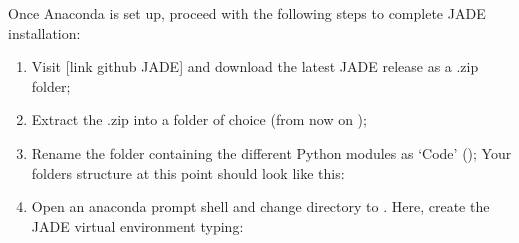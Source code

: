 \documentclass[letterpaper,10pt,english]{sphinxmanual}
\begin{document}
\sphinxAtStartPar
Once Anaconda is set up, proceed with the following steps to complete JADE installation:
\begin{enumerate}
%
\item {} 
\sphinxAtStartPar
Visit {[}link github JADE{]} and download the latest JADE release as a .zip folder;

\item {} 
\sphinxAtStartPar
Extract the .zip into a folder of choice (from now on );

\item {} 
\sphinxAtStartPar
Rename the folder containing the different Python modules as ‘Code’ ();
Your folders structure at this point should look like this:

\begin{sphinxVerbatim}[commandchars=\\\{\}]
   
               
               
               
               
               
\end{sphinxVerbatim}

\item {} 
\sphinxAtStartPar
Open an anaconda prompt shell and change directory to .
Here, create the JADE virtual environment typing:

\sphinxAtStartPar
{}


\end{enumerate}
\end{document}
